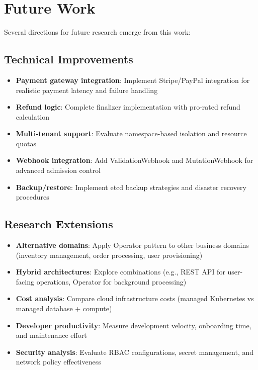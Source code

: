 \section{Future Work}\label{sec:future-work}

Several directions for future research emerge from this work:

\subsection{Technical Improvements}

\begin{itemize}
    \item \textbf{Payment gateway integration}: Implement Stripe/PayPal integration for realistic payment latency and failure handling
    
    \item \textbf{Refund logic}: Complete finalizer implementation with pro-rated refund calculation
    
    \item \textbf{Multi-tenant support}: Evaluate namespace-based isolation and resource quotas
    
    \item \textbf{Webhook integration}: Add ValidationWebhook and MutationWebhook for advanced admission control
    
    \item \textbf{Backup/restore}: Implement etcd backup strategies and disaster recovery procedures
\end{itemize}

\subsection{Research Extensions}

\begin{itemize}
    \item \textbf{Alternative domains}: Apply Operator pattern to other business domains (inventory management, order processing, user provisioning)
    
    \item \textbf{Hybrid architectures}: Explore combinations (e.g., REST API for user-facing operations, Operator for background processing)
    
    \item \textbf{Cost analysis}: Compare cloud infrastructure costs (managed Kubernetes vs managed database + compute)
    
    \item \textbf{Developer productivity}: Measure development velocity, onboarding time, and maintenance effort
    
    \item \textbf{Security analysis}: Evaluate RBAC configurations, secret management, and network policy effectiveness
\end{itemize}

